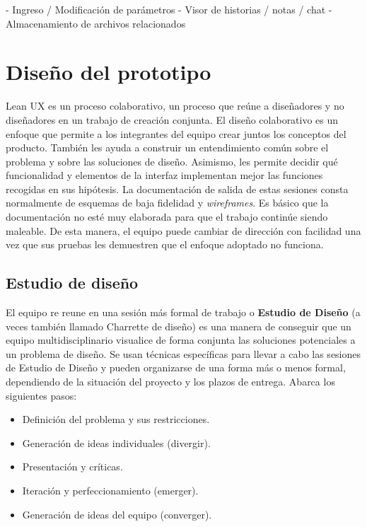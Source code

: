 - Ingreso / Modificación de parámetros
- Visor de historias / notas / chat
- Almacenamiento de archivos relacionados



\clearpage
\section{Diseño del prototipo}
Lean UX es un proceso colaborativo, un proceso que reúne a diseñadores y no diseñadores en un trabajo de creación conjunta. El diseño colaborativo es un enfoque que permite a los integrantes del equipo crear juntos los conceptos del producto. También les ayuda a construir un entendimiento común sobre el problema y sobre las soluciones de diseño. Asimismo, les permite decidir qué funcionalidad y elementos de la interfaz implementan mejor las funciones recogidas en sus hipótesis. La documentación de salida de estas sesiones consta normalmente de esquemas de baja fidelidad y \textit{wireframes}. Es básico que la documentación no esté muy elaborada para que el trabajo continúe siendo maleable. De esta manera, el equipo puede cambiar de dirección con facilidad una vez que sus pruebas les demuestren que el enfoque adoptado no funciona.

\subsection{Estudio de diseño}
El equipo re reune en una sesión más formal de trabajo o \textbf{Estudio de Diseño} (a veces también llamado Charrette de diseño)\citep{Gothelf2013} es una manera de conseguir que un equipo multidisciplinario visualice de forma conjunta las soluciones potenciales a un problema de diseño. Se usan técnicas específicas para llevar a cabo las sesiones de Estudio de Diseño y pueden organizarse de una forma más o menos formal, dependiendo de la situación del proyecto y los plazos de entrega. Abarca los siguientes pasos:
\begin{itemize}
    \item Definición del problema y sus restricciones. 
    \item Generación de ideas individuales (divergir). 
    \item Presentación y críticas. 
    \item Iteración y perfeccionamiento (emerger). 
    \item Generación de ideas del equipo (converger).
\end{itemize}


